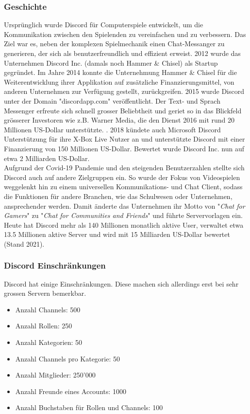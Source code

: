 \documentclass[a4paper, table]{article}
\begin{document}
\subsubsection*{Geschichte}
Ursprünglich wurde Discord für Computerspiele entwickelt, um die Kommunikation zwischen den Spielenden zu vereinfachen und zu verbessern. 
Das Ziel war es, neben der komplexen Spielmechanik einen Chat-Messanger zu generieren, der sich als benutzerfreundlich und effizient erweist. 
2012 wurde das Unternehmen Discord Inc. (damals noch Hammer \& Chisel) als Startup gegründet. \autocite{noauthor_discord_2021}
Im Jahre 2014 konnte die Unternehmung Hammer \& Chisel für die Weiterentwicklung ihrer Applikation auf zusätzliche Finanzierungsmittel, von anderen Unternehmen zur Verfügung gestellt, zurückgreifen.
2015 wurde Discord unter der Domain "discordapp.com" veröffentlicht. 
Der Text- und Sprach Messenger erfreute sich schnell grosser Beliebtheit und geriet so in das Blickfeld grösserer Investoren wie \gls{z.B.} Warner Media, die den Dienst 2016 mit rund 20 Millionen US-Dollar unterstützte. \autocite{noauthor_warner_2022} .
2018 kündete auch Microsoft Discord Unterstützung für ihre X-Box Live Nutzer an und unterstützte Discord mit einer Finanzierung von 150 Millionen US-Dollar. 
Bewertet wurde Discord Inc. nun auf etwa 2 Milliarden US-Dollar.\\
Aufgrund der Covid-19 Pandemie und den steigenden Benutzerzahlen stellte sich Discord auch auf andere Zielgruppen ein. 
So wurde der Fokus von Videospielen weggelenkt hin zu einem universellen Kommunikations- und Chat Client, sodass die Funktionen für andere Branchen, wie das Schulwesen oder Unternehmen, ansprechender werden. 
Damit änderte das Unternehmen ihr Motto von "\textit{Chat for Gamers}" zu "\textit{Chat for Communities and Friends}" und f\"uhrte Servervorlagen ein.\\
Heute hat Discord mehr als 140 Millionen monatlich aktive User, verwaltet etwa 13.5 Millionen aktive Server und wird mit 15 Milliarden US-Dollar bewertet (Stand 2021). \autocite{david_curry_discord_2022}

\subsubsection*{Discord Einschr\"ankungen}\label{discord_einschraenkungen}
Discord hat einige Einschränkungen. 
Diese machen sich allerdings erst bei sehr grossen Servern bemerkbar.\autocite{vultaggio_discord_2022}

\begin{itemize}
    \item Anzahl Channels: 500
    \item Anzahl Rollen: 250
    \item Anzahl Kategorien: 50
    \item Anzahl Channels pro Kategorie: 50
    \item Anzahl Mitglieder: 250'000
    \item Anzahl Freunde eines Accounts: 1000
    \item Anzahl Buchstaben für Rollen und Channels: 100
\end{itemize}
\end{document}
